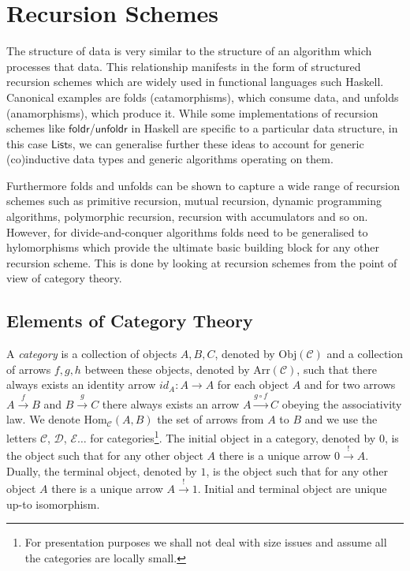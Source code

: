 \documentclass[a4paper,anonymous, UKenglish,cleveref, autoref, thm-restate]{lipics-v2021}
\newcommand{\operator}[1]{\textsf{#1}}
\newcommand{\CatC}{\mathcal{C}}
\newcommand{\CatD}{\mathcal{D}}
\newcommand{\CatE}{\mathcal{E}}
\newcommand{\Hom}{\text{Hom}}
\newcommand{\Obj}{\text{Obj}}
\newcommand{\Arr}{\text{Arr}}
\begin{document}
\section{Recursion Schemes}\label{sec:category-theory}
The structure of data is very similar to the structure of an algorithm which
processes that data. This relationship manifests in the form of structured
recursion schemes which are widely used in functional languages such Haskell.
Canonical examples are folds (catamorphisms), which consume data, and unfolds
(anamorphisms), which produce it. While some implementations of recursion
schemes like $\operator{foldr}$/$\operator{unfoldr}$ in Haskell are specific to
a particular data structure, in this case $\operator{List}$s, we can generalise
further these ideas to account for generic (co)inductive data types and generic
algorithms operating on them.

Furthermore folds and unfolds can be shown to capture a wide
range of recursion schemes such as primitive recursion, mutual recursion,
dynamic programming algorithms, polymorphic recursion, recursion with
accumulators and so on. However, for divide-and-conquer algorithms folds need to
be generalised to hylomorphisms which provide the ultimate basic building block
for any other recursion scheme. This is done by looking at recursion schemes
from the point of view of category theory.

\subsection{Elements of Category Theory}
A \emph{category} is a collection of objects $A, B, C$, denoted by $\Obj(\CatC)$
and a collection of arrows $f, g, h$ between these objects, denoted by $\Arr
(\CatC)$, such that there always exists an identity arrow $id_{A} : A \to A$ for
each object $A$ and for two arrows $A \xrightarrow{f} B$ and $B \xrightarrow{g}
C$ there always exists an arrow $A \xrightarrow{g\circ f} C$ obeying the
associativity law. We denote $\Hom_{\CatC} (A, B)$ the set of arrows from $A$ to
$B$ and we use the letters $\CatC$, $\CatD$, $\CatE\dots$ for
categories\footnote[1]{For presentation purposes we shall not deal with size
  issues and assume all the categories are locally small.}. The initial object
in a category, denoted by $0$, is the object such that for any other object $A$
there is a unique arrow $0 \xrightarrow{!} A$.  Dually, the terminal object,
denoted by $1$, is the object such that for any other object $A$ there is a
unique arrow $A \xrightarrow{!} 1$. Initial and terminal object are unique up-to
isomorphism.
\end{document}
